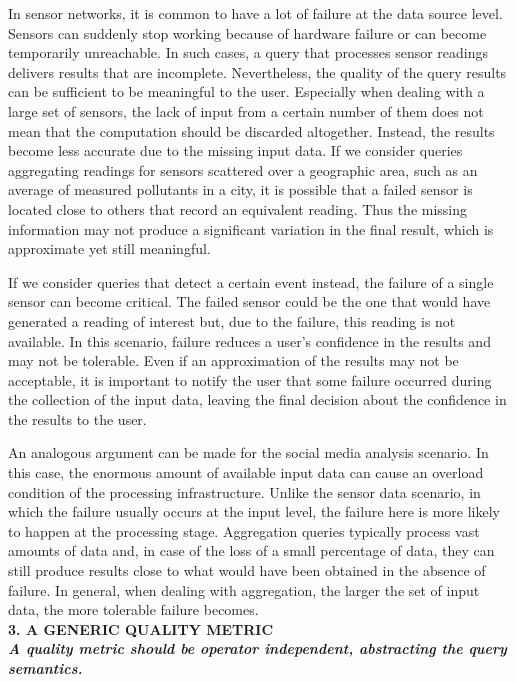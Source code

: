 In sensor networks, it is common to have a lot of failure at the data source level. Sensors can suddenly
stop working because of hardware failure or can become temporarily unreachable. In such cases, a query
that processes sensor readings delivers results that are incomplete. Nevertheless, the quality of the
query results can be sufficient to be meaningful to the user. Especially when dealing with a large set of
sensors, the lack of input from a certain number of them does not mean that the computation should be
discarded altogether. Instead, the results become less accurate due to the missing input data. If we
consider queries aggregating readings for sensors scattered over a geographic area, such as an average of
measured pollutants in a city, it is possible that a failed sensor is located close to others that
record an equivalent reading. Thus the missing information may not produce a significant variation in the final
result, which is approximate yet still meaningful.
	
If we consider queries that detect a certain event instead, the failure of a single sensor can become
critical. The failed sensor could be the one that would have generated a reading of interest but, due to
the failure, this reading is not available. In this scenario, failure reduces a user's confidence in the
results and may not be tolerable. Even if an approximation of the results may not be acceptable, it is
important to notify the user that some failure occurred during the collection of the input data, leaving
the final decision about the confidence in the results to the user.
	
An analogous argument can be made for the social media analysis scenario. In this case, the enormous
amount of available input data can cause an overload condition of the processing infrastructure.
Unlike the sensor data scenario, in which the failure usually occurs at the input level, the failure here
is more likely to happen at the processing stage. Aggregation queries typically process vast amounts of
data and, in case of the loss of a small percentage of data, they can still produce results close to what
would have been obtained in the absence of failure. In general, when dealing with aggregation, the larger
the set of input data, the more tolerable failure becomes.\\

\textbf{3. A GENERIC QUALITY METRIC \\ \textit{A quality metric should be operator independent, abstracting
the query semantics.}}
 
